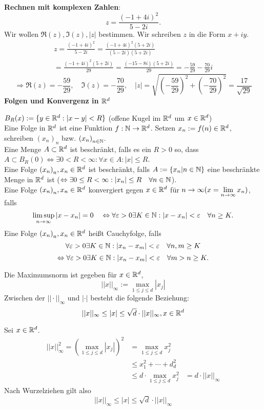 \documentclass[../ana1.tex]{subfiles}
\begin{document}
\textbf{Rechnen mit komplexen Zahlen}:
\[ z = \frac{{(-1 + 4i)}^2}{5-2i}. \] Wir wollen \( \Re(z), \Im(z), |z| \) bestimmen.
Wir schreiben \(z\) in die Form \(x+iy\).
\begin{align*}
	z = \frac{{(-1 + 4i)}^2}{5-2i} = \frac{{(-1 + 4i)}^2(5+2i)}{(5-2i)(5+2i)}\\
	= \frac{{(-1 + 4i)}^2(5+2i)}{29} = \frac{(-15-8i)(5+2i)}{29} = -\frac{59}{29} - \frac{70}{29}i
\end{align*}
\[ \Rightarrow \Re(z) = -\frac{59}{29},\quad \Im(z) = -\frac{70}{29},\quad |z| = \sqrt{ {\left(-\frac{59}{29}\right)}^2 + {\left(-\frac{70}{29}\right)}^2 } = \frac{17}{\sqrt{29}} \]
\textbf{Folgen und Konvergenz in \(\mathbb{R}^d\)}
\begin{defi}
	\( B_R(x) := \{ y\in\mathbb{R}^d : |x-y| < R \} \) (offene Kugel im \(\mathbb{R}^d\) um \( x\in\mathbb{R}^d \))
	\\%
	Eine Folge in \( \mathbb{R}^d \) ist eine Funktion \( f: \mathbb{N} \rightarrow \mathbb{R}^d \). Setzen \(x_n := f(n)\in\mathbb{R}^d \), schreiben \( {(x_n)}_n \) bzw. \({(x_n)}_{n\in\mathbb{N}}\).\\
	Eine Menge \( A\subset \mathbb{R}^d \) ist beschränkt, falls es ein \(R > 0\) so, dass \( A\subset B_R(0) \Leftrightarrow \exists 0<R<\infty:\forall x\in A: |x|\leq R \).\\
	Eine Folge \( {(x_n)}_n, x_n\in\mathbb{R}^d \) ist beschränkt, falls \(A := \{ x_n | n\in\mathbb{N} \} \) eine beschränkte Menge in \( \mathbb{R}^d \) ist (\( \Leftrightarrow \exists 0\leq R < \infty: |x_n| \leq R \quad \forall n\in\mathbb{N} \)).\\
	Eine Folge \( {(x_n)}_n, x_n\in\mathbb{R}^d \) konvergiert gegen \( x\in\mathbb{R}^d \) für \( n\rightarrow \infty (x=\lim\limits_{n\rightarrow\infty} x_n) \), falls 
	\[ \limsup\limits_{n\rightarrow\infty} |x-x_n| = 0 \quad \Leftrightarrow \forall \varepsilon > 0 \exists K\in\mathbb{N}: |x-x_n| < \varepsilon \quad \forall n\geq K. \]
	Eine Folge \( {(x_n)}_n, x_n\in\mathbb{R}^d \) heißt Cauchyfolge, falls 
	\[ \forall \varepsilon>0 \exists K\in\mathbb{N}: |x_n - x_m| < \varepsilon \quad \forall n,m\geq K \]
	\[ \Leftrightarrow \forall \varepsilon > 0 \exists K\in\mathbb{N}: |x_n-x_m| < \varepsilon \quad \forall m>n\geq K. \]
\end{defi}
\begin{bem}
	Die Maximumsnorm ist gegeben für \(x\in\mathbb{R}^d\),
	\[ ||x||_\infty := \underset{1\leq j\leq d}{\max} |x_j| \]
	Zwischen der \( ||\cdot||_\infty \) und \( |\cdot| \) besteht die folgende Beziehung:
	\[ ||x||_\infty \leq |x| \leq \sqrt{d} \cdot ||x||_\infty, x\in\mathbb{R}^d \]
\end{bem}
\begin{bew}
	Sei \(x\in\mathbb{R}^d\).
	\begin{align*}
		||x||_\infty^2 = {( \underset{1\leq j\leq d}{\max} |x_j| )}^2 &= \underset{1\leq j\leq d}{\max} x_j^2\\
		&\leq x_1^2 + \cdots + d_d^2\\
		&\leq d \cdot \underset{1\leq j\leq d}{\max} x_j^2
		&= d \cdot ||x||_\infty
	\end{align*}
	Nach Wurzelziehen gilt also
	\[ ||x||_\infty \leq |x| \leq \sqrt{d} \cdot ||x||_\infty \]
\end{bew}
\end{document}

